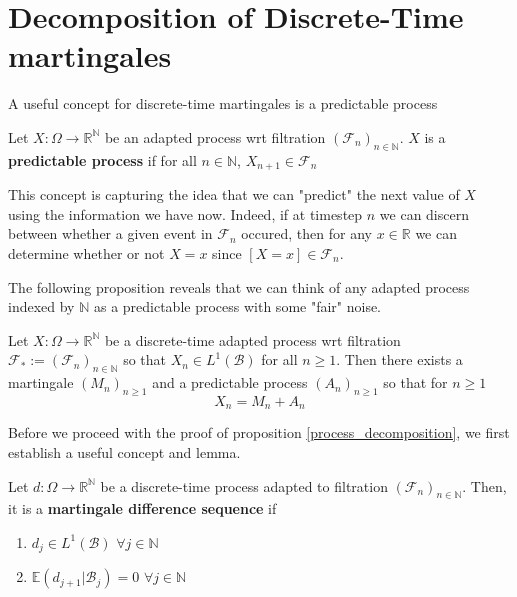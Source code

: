 \section{Decomposition of Discrete-Time martingales}

A useful concept for discrete-time martingales is a predictable process

\begin{definition}
    Let $X: \Omega \to \mathbb{R}^{\mathbb{N}}$ be an adapted process wrt filtration $(\mathcal{F}_{n})_{n \in \mathbb{N}}$. \(X\) is a \textbf{predictable process} if for all \(n \in \mathbb{N}\), \(X_{n+1} \in \mathcal{F}_{n}\)
\end{definition}

This concept is capturing the idea that we can "predict" the next value of \(X\) using the information we have now. Indeed, if at timestep \(n\) we can discern between whether a given event in \(\mathcal{F}_{n}\) occured, then for any \(x \in \mathbb{R}\) we can determine whether or not \(X = x\) since \([X=x] \in \mathcal{F}_{n}\).

The following proposition reveals that we can think of any adapted process indexed by \(\mathbb{N}\) as a predictable process with some "fair" noise.

\begin{proposition}
    \label{process_decomposition}
    Let $X: \Omega \to \mathbb{R}^{\mathbb{N}}$ be a discrete-time adapted process wrt filtration $\mathcal{F}_{*} := (\mathcal{F}_{n})_{n \in \mathbb{N}}$ so that \(X_{n} \in L^{1}(\mathcal{B})\) for all \(n \geq 1\). Then there exists a martingale \((M_{n})_{n \geq 1}\) and a predictable process \((A_{n})_{n \geq 1}\) so that for \(n \geq 1\)
    \[X_{n} = M_{n} + A_{n}\]
\end{proposition}

Before we proceed with the proof of proposition \ref{process_decomposition}, we first establish a useful concept and lemma.

\begin{definition}
    \label{difference_defn}
    Let $d: \Omega \to \mathbb{R}^{\mathbb{N}}$ be a discrete-time process adapted to filtration $(\mathcal{F}_{n})_{n \in \mathbb{N}}$. Then, it is a \textbf{martingale difference sequence} if
    \begin{enumerate}
        \item $d_{j} \in L^{1}(\mathcal{B})$ $\forall j \in \mathbb{N}$
        \item $\mathbb{E}(d_{j+1} | \mathcal{B}_{j}) = 0$ \(\forall j \in \mathbb{N}\)
    \end{enumerate}
\end{definition}

